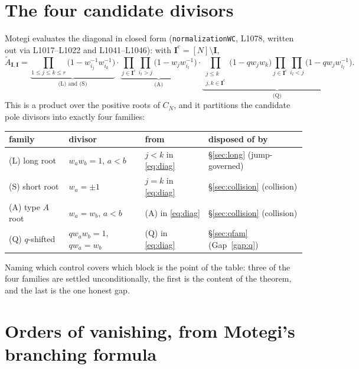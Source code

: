 \documentclass[11pt]{article}
\theoremstyle{plain}
\theoremstyle{definition}
\theoremstyle{remark}
\theoremstyle{plain}
\newcommand{\bI}{\mathbf{I}}
\newcommand{\At}{\widetilde{A}}
\begin{document}
\section{The four candidate divisors}
\label{sec:candidates}

Motegi evaluates the diagonal in closed form (\texttt{normalizationWC}, L1078,
written out via L1017--L1022 and L1041--L1046): with $\bI^{\mathrm c}=[N]
\setminus\bI$,
\begin{equation}
\At_{\bI,\bI}=
\underbrace{\prod_{1\le j\le k\le r}\bigl(1-w_{i_j}^{-1}w_{i_k}^{-1}\bigr)}_{\text{(L) and (S)}}
\cdot
\underbrace{\prod_{j\in\bI^{\mathrm c}}\prod_{i_l>j}\bigl(1-w_j w_{i_l}^{-1}\bigr)}_{\text{(A)}}
\cdot
\underbrace{\prod_{\substack{j\le k\\ j,k\in\bI^{\mathrm c}}}\bigl(1-qw_jw_k\bigr)
\prod_{j\in\bI^{\mathrm c}}\prod_{i_l<j}\bigl(1-qw_jw_{i_l}^{-1}\bigr)}_{\text{(Q)}} .
\label{eq:diag}
\end{equation}
This is a product over the positive roots of $C_N$, and it partitions the
candidate pole divisors into exactly four families:
\begin{center}
\begin{tabular}{@{}llll@{}}
\toprule
family & divisor & from & disposed of by \\
\midrule
(L) long root & $w_aw_b=1$, $a<b$ & $j<k$ in \eqref{eq:diag} & \S\ref{sec:long} (jump-governed) \\
(S) short root & $w_a=\pm1$ & $j=k$ in \eqref{eq:diag} & \S\ref{sec:collision} (collision) \\
(A) type $A$ root & $w_a=w_b$, $a<b$ & (A) in \eqref{eq:diag} & \S\ref{sec:collision} (collision) \\
(Q) $q$-shifted & $qw_aw_b=1$, $qw_a=w_b$ & (Q) in \eqref{eq:diag} & \S\ref{sec:qfam} (Gap~\ref{gap:q}) \\
\bottomrule
\end{tabular}
\end{center}
Naming which control covers which block is the point of the table: three of the
four families are settled unconditionally, the first is the content of the
theorem, and the last is the one honest gap.

\section{Orders of vanishing, from Motegi's branching formula}
\label{sec:orders}
\end{document}
